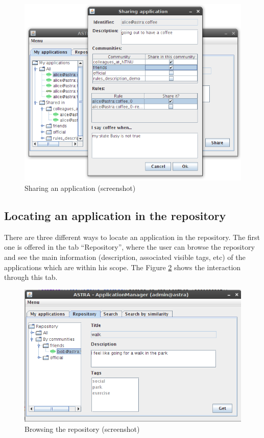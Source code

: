 \begin{figure}[h!]
 \begin{center}
 \includegraphics[scale=0.6]{screenshots/ui-sharing.png}
  \caption{\label{img:ui-sharing}Sharing an application (screenshot)}
 \end{center}
\end{figure}


\subsection{Locating an application in the repository}
\label{subsec:ui-locating}
There are three different ways to locate an application in the repository.
The first one is offered in the tab ``Repository'', where the user can browse
the repository and see the main information (description, associated
 visible tags, etc) of the applications which are within his scope. The Figure
 \ref{img:ui-repository} shows the interaction through this tab.
 
\begin{figure}[h!]
 \begin{center}
 \includegraphics[scale=0.6]{screenshots/ui-repository.png}
  \caption{\label{img:ui-repository}Browsing the repository (screenshot)}
 \end{center}
\end{figure}

